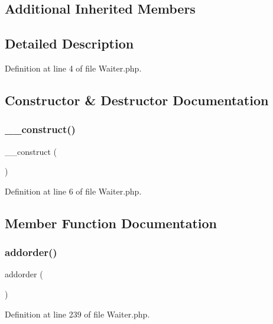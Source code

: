 \subsection*{Additional Inherited Members}


\subsection{Detailed Description}


Definition at line 4 of file Waiter.\+php.



\subsection{Constructor \& Destructor Documentation}
\mbox{\label{class_waiter_a095c5d389db211932136b53f25f39685}} 
\subsubsection{\texorpdfstring{\_\_construct()}{\_\_construct()}}
{\footnotesize\ttfamily \+\_\+\+\_\+construct (\begin{DoxyParamCaption}{ }\end{DoxyParamCaption})}



Definition at line 6 of file Waiter.\+php.



\subsection{Member Function Documentation}
\mbox{\label{class_waiter_a375fb206d13bec0bc37f55b825bcbebf}} 
\subsubsection{\texorpdfstring{addorder()}{addorder()}}
{\footnotesize\ttfamily addorder (\begin{DoxyParamCaption}{ }\end{DoxyParamCaption})}



Definition at line 239 of file Waiter.\+php.

